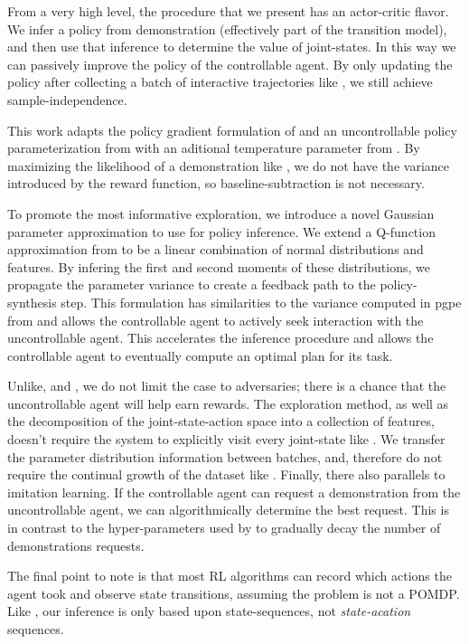     From a very high level, the procedure that we present has an actor-critic flavor. We infer a policy from
    demonstration (effectively part of the transition model), and then use that inference to determine the value of
    joint-states. In this way we can passively improve the policy of the controllable agent. By only updating the policy
    after collecting a batch of interactive trajectories like \cite{doshi2016hidden}, we still achieve
    sample-independence.

    This work adapts the policy gradient formulation of \cite{herman2016inverse} and an uncontrollable policy
    parameterization from \cite{tangkaratt2014model} with an aditional temperature parameter from
    \cite{nachum2017bridging}.  By maximizing the likelihood of a demonstration like \cite{herman2016inverse}, we do not
    have the variance introduced by the reward function, so baseline-subtraction is not necessary.

    To promote the most informative exploration, we introduce a novel Gaussian parameter approximation to use for policy
    inference. We extend a Q-function approximation from \cite{Sugiyama2015StatisticalRL} to be a linear combination of
    normal distributions and features. By infering the first and second moments of these distributions, we propagate the
    parameter variance to create a feedback path to the policy-synthesis step. This formulation has similarities to the
    variance computed in \ac{pgpe} from \cite{tangkaratt2014model} and allows the controllable agent to actively seek
    interaction with the uncontrollable agent. This accelerates the inference procedure and allows the controllable
    agent to eventually compute an optimal plan for its task.


    Unlike, \cite{lim2013reinforcement} and \cite{bertuccelli2012robust}, we do not limit the case to adversaries; there
    is a chance that the uncontrollable agent will help earn rewards. The exploration method, as well as  the
    decomposition of the joint-state-action space into a collection of features, doesn't require the system to
    explicitly visit every joint-state like \Rmax. We transfer the parameter distribution information between batches,
    and, therefore do not require the continual growth of the dataset like \DAGGER. Finally, there also parallels to
    imitation learning. If the controllable agent can request a demonstration from the uncontrollable agent, we can
    algorithmically determine the best request. This is in contrast to the hyper-parameters used by \DAGGER to gradually
    decay the number of demonstrations requests.

    The final point to note is that most \ac{RL} algorithms can record which actions the agent took and observe state
    transitions, assuming the problem is not a \ac{POMDP}. Like \cite{lim2013reinforcement}, our inference is only based
    upon state-sequences, not \textit{state-acation} sequences.


